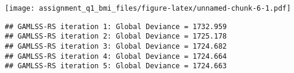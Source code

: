 \begin{Shaded}
\begin{Highlighting}[]
\NormalTok{(}\NormalTok{, }\NormalTok{, }\NormalTok{, }\NormalTok{), }\NormalTok{, }\NormalTok{, } \NormalTok{)}
\end{Highlighting}
\end{Shaded}

\texttt{[image: assignment\_q1\_bmi\_files/figure-latex/unnamed-chunk-6-1.pdf]}

\begin{Shaded}
\begin{Highlighting}[]
\end{Highlighting}
\end{Shaded}

\begin{Shaded}
\begin{Highlighting}[]
\OtherTok{\textless{}{-}} \SpecialCharTok{\textasciitilde{}} \NormalTok{, }
\end{Highlighting}
\end{Shaded}

\begin{verbatim}
## GAMLSS-RS iteration 1: Global Deviance = 1732.959 
## GAMLSS-RS iteration 2: Global Deviance = 1725.178 
## GAMLSS-RS iteration 3: Global Deviance = 1724.682 
## GAMLSS-RS iteration 4: Global Deviance = 1724.664 
## GAMLSS-RS iteration 5: Global Deviance = 1724.663
\end{verbatim}

\begin{Shaded}
\begin{Highlighting}[]
\OtherTok{\textless{}{-}} \SpecialCharTok{\textasciitilde{}} \NormalTok{, }
\end{Highlighting}
\end{Shaded}

